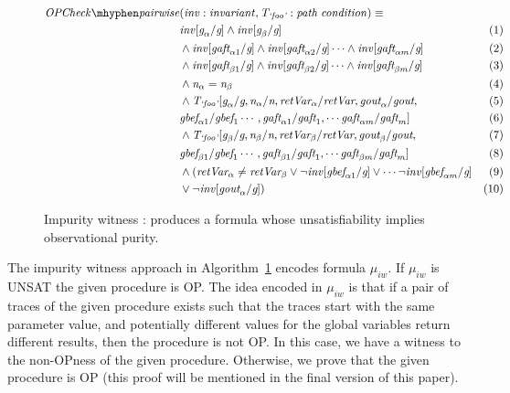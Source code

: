 \documentclass{llncs}
\newcommand{\foo}{\textit{`foo'}}
\newcommand{\inv}{\mathit{inv}}
\newcommand{\pathCondition}{\mathit{T_{\foo}}}
\newcommand{\OPCheckA}{\mathit{OPCheck \mhyphen pairwise}}
\newcommand{\mi}[1]{\mathit{#1}}
\newcommand{\retVar}{\textit{retVar}}
\newcommand{\n}{\textit{n}}
\newcommand{\g}{\textit{g}}
\newcommand{\gout}{\textit{gout}}
\newcommand{\gbef}{\textit{gbef}}
\newcommand{\gaft}{\textit{gaft}}
\newcommand{\formula}{\mu}
\begin{document}
\begin{figure}[htp]
  \begin{algorithm}[H]
    \begin{align*}
      \OPCheckA &\mi{(\inv : invariant,
        \pathCondition: path\; condition)} \equiv &\\
      &\inv[\g_\alpha/\g] \wedge \inv[\g_\beta/\g]  & (1)\\
      & \wedge \inv[\gaft_{\alpha1}/\g] \wedge
      \inv[\gaft_{\alpha2}/\g] \cdots \wedge \inv[\gaft_{\alpha m}/\g]
      & (2)\\
      & \wedge \inv[\gaft_{\beta1}/\g] \wedge \inv[\gaft_{\beta2}/\g]
      \cdots \wedge \inv[\gaft_{\beta m}/\g] & (3)\\
      &\wedge \n_\alpha = \n_\beta  & (4)\\
      &\wedge \pathCondition[\g_\alpha/\g, \n_\alpha/\n, \retVar_\alpha/\retVar,
        \gout_\alpha/\gout, & (5)\\
        &\gbef_{\alpha1}/\gbef_1 \cdots, \gaft_{\alpha 1}/\gaft_1, \cdots
        \gaft_{\alpha m}/\gaft_m]  & (6)\\
      &\wedge \pathCondition[\g_\beta/\g, \n_\beta/\n, \retVar_\beta/\retVar,
        \gout_\beta/\gout, & (7)\\
        &\gbef_{\beta1}/\gbef_1 \cdots, \gaft_{\beta 1}/\gaft_1, \cdots
        \gaft_{\beta m}/\gaft_m] & (8)\\
      &\wedge (\retVar_\alpha \neq \retVar_\beta \vee \neg\inv[\gbef_{\alpha1}/\g] \vee
       \cdots \neg\inv[\gbef_{\alpha m}/\g] & (9) \\
        &\vee \neg\inv[\gout_\alpha/\g])  & (10)\\
    \end{align*}
    \caption{Impurity witness : produces a formula whose unsatisfiability
    implies observational purity.}
    \label{algo:pairwiseOPcheckCombined}
  \end{algorithm}  
\end{figure}

The impurity witness approach in
Algorithm~\ref{algo:pairwiseOPcheckCombined} encodes formula
$\formula_{iw}$. If $\formula_{iw}$ is UNSAT the given procedure is
OP. The idea encoded in $\formula_{iw}$ is that if a pair of traces of
the given procedure exists such that the traces start with the same
parameter value, and potentially different values for the global
variables return different results, then the procedure is not OP. In
this case, we have a witness to the non-OPness of the given
procedure. Otherwise, we prove that the given procedure is OP (this
proof will be mentioned in the final version of this paper).
\end{document}
